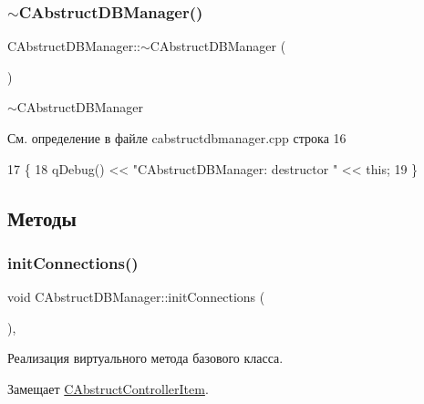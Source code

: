 \subsubsection{\texorpdfstring{$\sim$\+C\+Abstruct\+D\+B\+Manager()}{~CAbstructDBManager()}}
{\footnotesize\ttfamily C\+Abstruct\+D\+B\+Manager\+::$\sim$\+C\+Abstruct\+D\+B\+Manager (\begin{DoxyParamCaption}{ }\end{DoxyParamCaption})\hspace{0.3cm}{\ttfamily [virtual]}}



$\sim$\+C\+Abstruct\+D\+B\+Manager 



См. определение в файле cabstructdbmanager.\+cpp строка 16


\begin{DoxyCode}
17 \{
18     qDebug() << \textcolor{stringliteral}{"CAbstructDBManager: destructor "} << \textcolor{keyword}{this};
19 \}
\end{DoxyCode}


\subsection{Методы}
\hypertarget{class_c_abstruct_d_b_manager_ad450c557df6d9a7dfcc4a37082f35659}{}\label{class_c_abstruct_d_b_manager_ad450c557df6d9a7dfcc4a37082f35659} 
\subsubsection{\texorpdfstring{init\+Connections()}{initConnections()}}
{\footnotesize\ttfamily void C\+Abstruct\+D\+B\+Manager\+::init\+Connections (\begin{DoxyParamCaption}{ }\end{DoxyParamCaption})\hspace{0.3cm}{\ttfamily [protected]}, {\ttfamily [virtual]}}



Реализация виртуального метода базового класса. 



Замещает \hyperlink{class_c_abstruct_controller_item_a27c6889230a86cb0782e6d7596b883c1}{C\+Abstruct\+Controller\+Item}.



